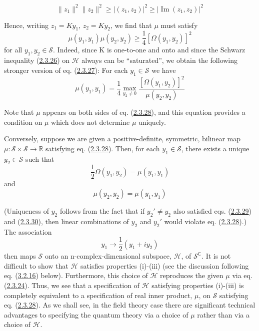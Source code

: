 \documentclass[11pt,a4paper]{article}
\begin{document}
\hypertarget{source-43}{}
\begin{equation*}
\lVert z_1\rVert^2 \lVert z_2\rVert^2 \ge |(z_1, z_2)|^2 \ge |\operatorname{Im}(z_1, z_2)|^2 \tag{2.3.26}\label{eq:2.3.26}
\end{equation*}

Hence, writing \(z_1=Ky_1\), \(z_2=Ky_2\), we find that \(\mu\) must satisfy
\begin{equation*}
\mu(y_1, y_1) \mu(y_2, y_2) \ge \frac{1}{4} [\Omega(y_1, y_2)]^2 \tag{2.3.27}\label{eq:2.3.27}
\end{equation*}
for all \(y_1,y_2 \in \mathcal{S}\). Indeed, since K is one-to-one and onto and since the Schwarz inequality (\hyperref[eq:2.3.26]{2.3.26}) on \(\mathcal{H}\) always can be ``saturated'', we obtain the following stronger version of eq. (\hyperref[eq:2.3.27]{2.3.27}): For each \(y_1 \in \mathcal{S}\) we have
\begin{equation*}
\mu(y_1, y_1) = \frac{1}{4} \max_{y_2 \neq 0} \frac{[\Omega(y_1, y_2)]^2}{\mu(y_2, y_2)} \tag{2.3.28}\label{eq:2.3.28}
\end{equation*}

Note that \(\mu\) appears on both sides of eq. (\hyperref[eq:2.3.28]{2.3.28}), and this equation provides a condition on \(\mu\) which does not determine \(\mu\) uniquely.

Conversely, suppose we are given a positive-definite, symmetric, bilinear map \(\mu: \mathcal{S}\times\mathcal{S} \to \mathbb{R}\) satisfying eq. (\hyperref[eq:2.3.28]{2.3.28}). Then, for each \(y_1 \in \mathcal{S}\), there exists a unique \(y_2 \in \mathcal{S}\) such that
\begin{equation*}
\frac{1}{2}\Omega(y_1,y_2) = \mu(y_1,y_1) \tag{2.3.29}\label{eq:2.3.29}
\end{equation*}
and
\begin{equation*}
\mu(y_2, y_2) = \mu(y_1, y_1) \tag{2.3.30}\label{eq:2.3.30}
\end{equation*}

(Uniqueness of \(y_2\) follows from the fact that if \(y_2' \neq y_2\) also satisfied eqs. (\hyperref[eq:2.3.29]{2.3.29}) and (\hyperref[eq:2.3.30]{2.3.30}), then linear combinations of \(y_2\) and \(y_2'\) would violate eq. (\hyperref[eq:2.3.28]{2.3.28}).) The association
\begin{equation*}
y_1 \rightarrow \frac{1}{2} (y_1 + iy_2) \tag{2.3.31}\label{eq:2.3.31}
\end{equation*}
then maps \(\mathcal{S}\) onto an n-complex-dimensional subspace, \(\mathcal{H}\), of \(\mathcal{S}^{\mathbb{C}}\). It is not difficult to show that \(\mathcal{H}\) satisfies properties (i)-(iii) (see the discussion following eq. (\hyperref[eq:3.2.16]{3.2.16}) below). Furthermore, this choice of \(\mathcal{H}\) reproduces the given \(\mu\) via eq. (\hyperref[eq:2.3.24]{2.3.24}). Thus, we see that a specification of \(\mathcal{H}\) satisfying properties (i)-(iii) is completely equivalent to a specification of real inner product, \(\mu\), on \(\mathcal{S}\) satisfying eq. (\hyperref[eq:2.3.28]{2.3.28}). As we shall see, in the field theory case there are significant technical advantages to specifying the quantum theory via a choice of \(\mu\) rather than via a choice of \(\mathcal{H}\).
\end{document}

